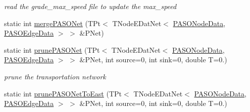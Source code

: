 \begin{DoxyCompactItemize}
\begin{DoxyCompactList}\small\item\em read the grade\+\_\+max\+\_\+speed file to update the max\+\_\+speed \end{DoxyCompactList}\item 
static int \hyperlink{class_p_a_s_o_util_a76d5f914bc72df4297615fffeba987c2}{merge\+P\+A\+S\+O\+Net} (T\+Pt$<$ T\+Node\+E\+Dat\+Net$<$ \hyperlink{class_p_a_s_o_node_data}{P\+A\+S\+O\+Node\+Data}, \hyperlink{class_p_a_s_o_edge_data}{P\+A\+S\+O\+Edge\+Data} $>$ $>$ \&P\+Net)
\item 
static int \hyperlink{class_p_a_s_o_util_a6a218d9301280f7b08f6c8e380129281}{prune\+P\+A\+S\+O\+Net} (T\+Pt$<$ T\+Node\+E\+Dat\+Net$<$ \hyperlink{class_p_a_s_o_node_data}{P\+A\+S\+O\+Node\+Data}, \hyperlink{class_p_a_s_o_edge_data}{P\+A\+S\+O\+Edge\+Data} $>$ $>$ \&P\+Net, int source=0, int sink=0, double T=0.)
\begin{DoxyCompactList}\small\item\em prune the transportation network \end{DoxyCompactList}\item 
\hypertarget{class_p_a_s_o_util_a22ed037107f930c3bf819e8b27f63c86}{}static int \hyperlink{class_p_a_s_o_util_a22ed037107f930c3bf819e8b27f63c86}{prune\+P\+A\+S\+O\+Net\+To\+East} (T\+Pt$<$ T\+Node\+E\+Dat\+Net$<$ \hyperlink{class_p_a_s_o_node_data}{P\+A\+S\+O\+Node\+Data}, \hyperlink{class_p_a_s_o_edge_data}{P\+A\+S\+O\+Edge\+Data} $>$ $>$ \&P\+Net, int source=0, int sink=0, double T=0.)\label{class_p_a_s_o_util_a22ed037107f930c3bf819e8b27f63c86}


\end{DoxyCompactItemize}
